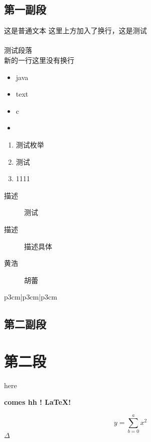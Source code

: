 \documentclass[utf8]{ctexart}
\begin{document}
\subsection{第一副段}
这是普通文本
这里上方加入了换行，这是测试\paragraph{}测试段落\\新的一行\newline 这里没有换行
\begin{itemize}
    \item java
    \item text
    \item c
    \item
\end{itemize}
\begin{enumerate}
    \item 测试枚举
    \item 测试
    \item 1111
\end{enumerate}
\begin{description}
    \item[描述] 测试
    \item[描述] 描述具体
    \item[黄浩] 胡蕾
\end{description}
\begin{table}
    \begin{tabular}{{p{3cm}|p{3cm}|p{3cm}}}
        \hline %
    \end{tabular}
\end{table}
\subsection{第二副段}
\newpage
\section{第二段}

\indent here \par \bf comes hh ! \LaTeX!

$$y = \sum_{b=0}^{a} x^2$$
$\Delta$
\end{document}
